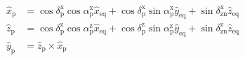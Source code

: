 \documentclass{beamer}
\begin{document}
\begin{frame}
\begin{columns}
  \end{columns}

\begin{equation*}
  \begin{split}
  \hat{x}_\text{p} &= \cos\delta^\text{x}_\text{p}\cos\alpha^\text{x}_\text{p}\hat{x}_\text{eq} + \cos\delta^\text{x}_\text{p}\sin\alpha^\text{x}_\text{p}\hat{y}_\text{eq} + \sin\delta^\text{x}_\text{zn}\hat{z}_\text{eq}\\
  \hat{z}_\text{p} &= \cos\delta^\text{z}_\text{p}\cos\alpha^\text{z}_\text{p}\hat{x}_\text{eq} + \cos\delta^\text{z}_\text{p}\sin\alpha^\text{z}_\text{p}\hat{y}_\text{eq} + \sin\delta^\text{z}_\text{zn}\hat{z}_\text{eq}\\
  \hat{y}_\text{p} &= \hat{z}_\text{p} \times \hat{x}_\text{p}
  \end{split}
  \label{eq:tf_eq_p}
\end{equation*}
\end{frame}




\end{document}

